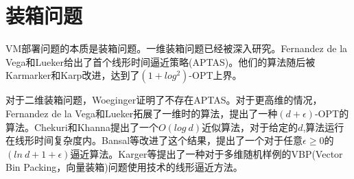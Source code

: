 \section{装箱问题}
VM部署问题的本质是装箱问题。一维装箱问题已经被深入研究。Fernandez de la Vega和Lueker\cite{Vega81}给出了首个线形时间逼近策略(APTAS)。他们的算法随后被Karmarker和Karp\cite{Karm82}改进，达到了$(1+log^2)$-\textsf{OPT}上界。

对于二维装箱问题，Woeginger\cite{Woeg97}证明了不存在APTAS。对于更高维的情况，Fernandez de la Vega和Lueker拓展了一维时的算法，提出了一种$(d+\epsilon)$-\textsf{OPT}的算法。Chekuri和Khanna\cite{Chan99}提出了一个$O(log~d)$近似算法，对于给定的$d$,算法运行在线形时间复杂度内。Bansal等\cite{Bans07}改进了这个结果，提出了一个对于任意$\epsilon \geq 0$的$(ln~d + 1 + \epsilon)$逼近算法。Karger等\cite{Karg07}提出了一种对于多维随机样例的VBP(Vector Bin Packing，向量装箱)问题使用技术的线形逼近方法。




